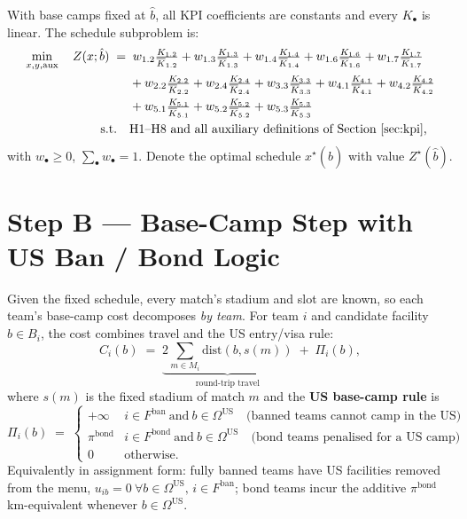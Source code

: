 \documentclass[12pt, letterpaper]{article}
\newcommand{\dist}{\mathrm{dist}}
\begin{document}
With base camps fixed at $\hat b$, all KPI coefficients are constants
and every $K_\bullet$ is linear. The schedule subproblem is:
\begin{align}
  \min_{x,y,\text{aux}}\quad
  Z(x;\hat b)\;=\;
  &\;w_{1.2}\tfrac{K_{1.2}}{\overline{K}_{1.2}}
   +w_{1.3}\tfrac{K_{1.3}}{\overline{K}_{1.3}}
   +w_{1.4}\tfrac{K_{1.4}}{\overline{K}_{1.4}}
   +w_{1.6}\tfrac{K_{1.6}}{\overline{K}_{1.6}}
   +w_{1.7}\tfrac{K_{1.7}}{\overline{K}_{1.7}}
   \notag\\
  &+w_{2.2}\tfrac{K_{2.2}}{\overline{K}_{2.2}}
   +w_{2.4}\tfrac{K_{2.4}}{\overline{K}_{2.4}}
   +w_{3.3}\tfrac{K_{3.3}}{\overline{K}_{3.3}}
   +w_{4.1}\tfrac{K_{4.1}}{\overline{K}_{4.1}}
   +w_{4.2}\tfrac{K_{4.2}}{\overline{K}_{4.2}}
   \notag\\
  &+w_{5.1}\tfrac{K_{5.1}}{\overline{K}_{5.1}}
   +w_{5.2}\tfrac{K_{5.2}}{\overline{K}_{5.2}}
   +w_{5.3}\tfrac{K_{5.3}}{\overline{K}_{5.3}}
  \label{eq:Zobj}\\
  \text{s.t.}\quad & \text{H1--H8 and all auxiliary definitions of
    Section~\ref{sec:kpi},}\notag
\end{align}
with $w_\bullet\ge 0$, $\sum_\bullet w_\bullet=1$. Denote the optimal
schedule $x^\star(\hat b)$ with value $Z^\star(\hat b)$.

\section{Step B --- Base-Camp Step with US Ban / Bond Logic}
\label{sec:stepB}

Given the fixed schedule, every match's stadium and slot are known, so
each team's base-camp cost decomposes \emph{by team}. For team $i$ and
candidate facility $b\in B_i$, the cost combines travel and the US
entry/visa rule:
\begin{equation}
  C_i(b)\;=\;
    \underbrace{2\!\!\sum_{m\in M_i}\!\dist(b,s(m))}_{\text{round-trip travel}}
    \;+\;\Pi_i(b),
  \label{eq:Cib}
\end{equation}
where $s(m)$ is the fixed stadium of match $m$ and the \textbf{US
base-camp rule} is
\begin{equation}
  \Pi_i(b)\;=\;
  \begin{cases}
    +\infty & i\in F^{\mathrm{ban}}\ \text{and}\ b\in\Omega^{\mathrm{US}}
              \quad\text{(banned teams cannot camp in the US)}\\[4pt]
    \pi^{\mathrm{bond}} & i\in F^{\mathrm{bond}}\ \text{and}\
              b\in\Omega^{\mathrm{US}}
              \quad\text{(bond teams penalised for a US camp)}\\[4pt]
    0 & \text{otherwise.}
  \end{cases}
  \label{eq:visa}
\end{equation}
Equivalently in assignment form: fully banned teams have US facilities
removed from the menu, $u_{ib}=0\ \forall b\in\Omega^{\mathrm{US}},\,i\in
F^{\mathrm{ban}}$; bond teams incur the additive $\pi^{\mathrm{bond}}$
km-equivalent whenever $b\in\Omega^{\mathrm{US}}$.
\end{document}
